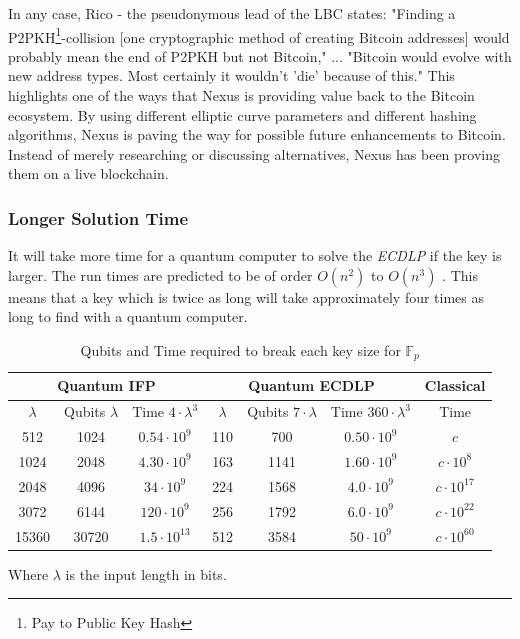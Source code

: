 \documentclass[11pt]{article}
\begin{document}
\noindent In any case, Rico - the pseudonymous lead of the LBC states: "Finding a P2PKH\footnote{Pay to Public Key Hash\cite{p2pkh}}-collision [one cryptographic method of creating Bitcoin addresses] would probably mean the end of P2PKH but not Bitcoin," ... "Bitcoin would evolve with new address types. Most certainly it wouldn't 'die' because of this."\cite{largebitcoin}
This highlights one of the ways that Nexus is providing value back to the Bitcoin ecosystem.
By using different elliptic curve parameters and different hashing algorithms, Nexus is paving the way for possible future enhancements to Bitcoin.
Instead of merely researching or discussing alternatives, Nexus has been proving them on a live blockchain.

\subsubsection*{Longer Solution Time}

It will take more time for a quantum computer to solve the \textit{ECDLP} if the key is larger.
The run times are predicted to be of order $O(n^2)$ to $O(n^3)$ \cite{prooszalka,kayezalka}.
This means that a key which is twice as long will take approximately four times as long to find with a quantum computer.

\begin{table}[ht]
\caption{Qubits and Time required to break each key size for $\mathbb{F}_{p}$ \cite{quantumattacks}}
\begin{center}
\begin{tabular}{|c|c|c||c|c|c||c|}
    \hline
    \multicolumn{3}{|c||}{Quantum IFP} &
    \multicolumn{3}{c||}{Quantum ECDLP} &
    Classical \\
    \hline
    $\lambda$ & Qubits $\lambda$ & Time $4 \cdot \lambda ^ 3$ & $\lambda$ & Qubits $7 \cdot \lambda$ & Time $360 \cdot \lambda ^ 3$ & Time \\
    \hline
    \hline
    512 & 1024 & $0.54 \cdot 10^9$ & 
    110 & 700  & $0.50 \cdot 10^9$ & $c$ \\
    
    1024 & 2048 & $4.30 \cdot 10^9$ & 
    163  & 1141 & $1.60 \cdot 10^9$ & $c \cdot 10^8$ \\
    
    2048 & 4096 & $34 \cdot 10^9$ & 
    224  & 1568 & $4.0 \cdot 10^9$ & $c \cdot 10^{17}$ \\
    
    3072 & 6144 & $120 \cdot 10^9$ & 
    256 & 1792  & $6.0 \cdot 10^9$ & $c \cdot 10^{22}$ \\
    
    15360 & 30720 & $1.5 \cdot 10^{13}$ & 
    512   & 3584  & $50 \cdot 10^9$ & $c \cdot 10^{60}$ \\
    \hline
\end{tabular}
Where $\lambda$ is the input length in bits.
\end{center}
\end{table}
\end{document}

